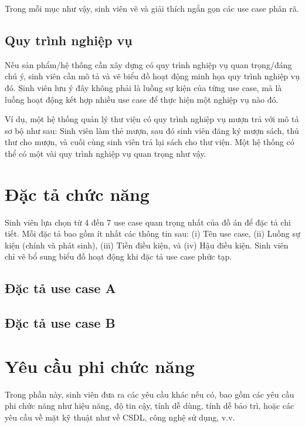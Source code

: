 \documentclass[../DoAn.tex]{subfiles}
\begin{document}
Trong mỗi mục như vậy, sinh viên vẽ và giải thích ngắn gọn các use case phân rã.

\subsection{Quy trình nghiệp vụ}
\label{subsection:2.2.3}
Nếu sản phẩm/hệ thống cần xây dựng có quy trình nghiệp vụ quan trọng/đáng chú ý, sinh viên cần mô tả và vẽ biểu đồ hoạt động minh họa quy trình nghiệp vụ đó. Sinh viên lưu ý đây không phải là luồng sự kiện của từng use case, mà là luồng hoạt động kết hợp nhiều use case để thực hiện một nghiệp vụ nào đó.

Ví dụ, một hệ thống quản lý thư viện có quy trình nghiệp vụ mượn trả với mô tả sơ bộ như sau: Sinh viên làm thẻ mượn, sau đó sinh viên đăng ký mượn sách, thủ thư cho mượn, và cuối cùng sinh viên trả lại sách cho thư viện. Một hệ thống có thể có một vài quy trình nghiệp vụ quan trọng như vậy.
\section{Đặc tả chức năng}
\label{section:2.3}
Sinh viên lựa chọn từ 4 đến 7 use case quan trọng nhất của đồ án để đặc tả chi tiết. Mỗi đặc tả bao gồm ít nhất các thông tin sau: (i) Tên use case, (ii) Luồng sự kiện (chính và phát sinh), (iii) Tiền điều kiện, và (iv) Hậu điều kiện. Sinh viên chỉ vẽ bổ sung biểu đồ hoạt động khi đặc tả use case phức tạp.
\subsection{Đặc tả use case A}
\hfill
\subsection{Đặc tả use case B}
\hfill

\section{Yêu cầu phi chức năng}
\label{section:2.4}
Trong phần này, sinh viên đưa ra các yêu cầu khác nếu có, bao gồm các yêu cầu phi chức năng như hiệu năng, độ tin cậy, tính dễ dùng, tính dễ bảo trì, hoặc các yêu cầu về mặt kỹ thuật như về CSDL, công nghệ sử dụng, v.v.


\end{document}
